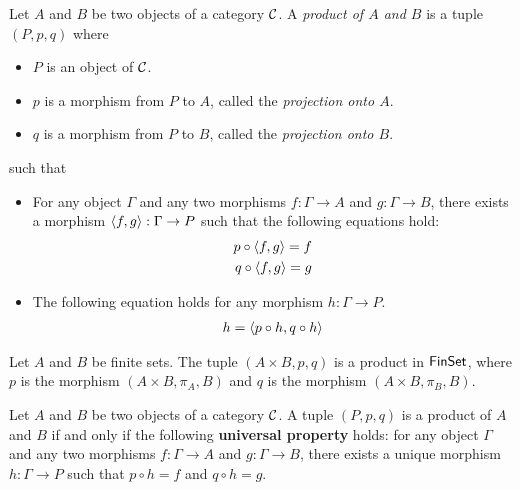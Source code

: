 \begin{definition}[Product]
  Let \(A\) and \(B\) be two objects of a category \(\mathcal C\).
  A \emph{product of \(A\) and \(B\)}
  is a tuple \((P,p,q)\)
  where
  \begin{itemize}
  \item \(P\) is an object of \(\mathcal C\).
  \item \(p\) is a morphism from \(P\) to \(A\),
    called the \emph{projection onto \(A\)}.
  \item \(q\) is a morphism from \(P\) to \(B\),
    called the \emph{projection onto \(B\)}.
  \end{itemize}
  such that
  \begin{itemize}
  \item For any object \(\Gamma\) and any two morphisms \(f : \Gamma \to A\)
    and \(g : \Gamma \to B\),
    there exists a morphism \(\langle f,g\rangle : \Gamma \to P\)
    such that the following equations hold:
    \begin{align}
      p \circ \langle f,g\rangle = f \\
      q \circ \langle f,g\rangle = g
    \end{align}
  \item The following equation holds for any morphism \(h : \Gamma \to P\).
    \begin{align}
      h = \langle p \circ h, q \circ h\rangle
    \end{align}
  \end{itemize}
\end{definition}

\begin{proposition}
  Let \(A\) and \(B\) be finite sets.
  The tuple \((A \times B, p, q)\)
  is a product in \(\mathsf{FinSet}\),
  where \(p\) is the morphism \((A\times B,\pi_A,B)\)
  and \(q\) is the morphism \((A \times B,\pi_B,B)\).
\end{proposition}

\begin{proposition}
  Let \(A\) and \(B\) be two objects of a category \(\mathcal C\).
  A tuple \((P,p,q)\) is a product of \(A\) and \(B\)
  if and only if the following \textbf{universal property}
  holds:
  for any object \(\Gamma\) and any two morphisms \(f : \Gamma \to A\)
  and \(g : \Gamma \to B\),
  there exists a unique morphism \(h : \Gamma \to P\)
  such that \(p \circ h = f\) and \(q \circ h = g\).
\end{proposition}

